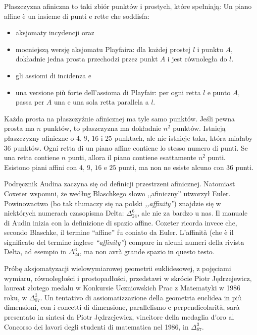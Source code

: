 \begin{proposition}
    Płaszczyzna afiniczna to taki zbiór punktów i prostych, które spełniają: %
    Un piano affine è un insieme di punti e rette che soddisfa: %
    \begin{itemize}
        \item aksjomaty incydencji oraz %
        \item mocniejszą wersję aksjomatu Playfaira: dla każdej prostej $l$ i punktu $A$, dokładnie jedna prosta przechodzi przez punkt $A$ i jest równoległa do $l$. %
        \item gli assiomi di incidenza e %
        \item una versione più forte dell'assioma di Playfair: per ogni retta $l$ e punto $A$, passa per $A$ una e una sola retta parallela a $l$. %
    \end{itemize}
    Każda prosta na płaszczyźnie afinicznej ma tyle samo punktów. %
    Jeśli pewna prosta ma $n$ punktów, to płaszczyzna ma dokładnie $n^2$ punktów. %
    Istnieją płaszczyzny afiniczne o $4$, $9$, $16$ i $25$ punktach, ale nie istnieje taka, która miałaby $36$ punktów. %
    Ogni retta di un piano affine contiene lo stesso numero di punti. %
    Se una retta contiene $n$ punti, allora il piano contiene esattamente $n^2$ punti. %
    Esistono piani affini con $4$, $9$, $16$ e $25$ punti, ma non ne esiste alcuno con $36$ punti. %
\end{proposition} %

Podręcznik Audina \cite[s. 7]{audin_2003} zaczyna się od definicji przestrzeni afinicznej. %
Natomiast Coxeter \cite[s. 209]{coxeter_1967} wspomni, że według Blaschkego słowo ,,afiniczny'' utworzył Euler. %
Powinowactwo (bo tak tłumaczy się na polski \emph{,,affinity''}) znajdzie się w niektórych numerach czasopisma Delta: $\Delta_{24}^6$, ale nie za bardzo u nas. %
Il manuale di Audin \cite[p. 7]{audin_2003} inizia con la definizione di spazio affine. %
Coxeter \cite[p. 209]{coxeter_1967} ricorda invece che, secondo Blaschke, il termine ``affine'' fu coniato da Euler. %
L'affinità (che è il significato del termine inglese \emph{``affinity''}) compare in alcuni numeri della rivista Delta, ad esempio in $\Delta_{24}^6$, ma non avrà grande spazio in questo testo. %

Próbę aksjomatyzacji wielowymiarowej geometrii euklidesowej, z pojęciami wymiaru, równoległości i prostopadłości, przedstawi w skrócie Piotr Jędrzejewicz, laureat złotego medalu w Konkursie Uczniowskich Prac z Matematyki w 1986 roku, w $\Delta_{87}^{3}$. %
Un tentativo di assiomatizzazione della geometria euclidea in più dimensioni, con i concetti di dimensione, parallelismo e perpendicolarità, sarà presentato in sintesi da Piotr Jędrzejewicz, vincitore della medaglia d'oro al Concorso dei lavori degli studenti di matematica nel 1986, in $\Delta_{87}^{3}$. %

%